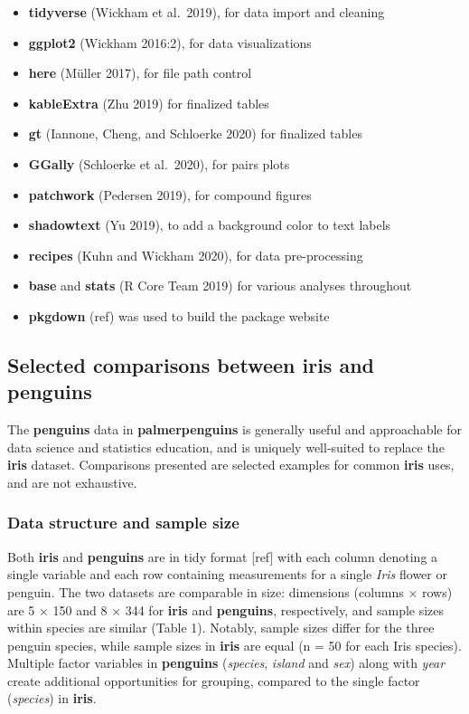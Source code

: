 \begin{itemize}
\tightlist
\item
  \textbf{tidyverse} (Wickham et al.~2019), for data import and cleaning
\item
  \textbf{ggplot2} (Wickham 2016:2), for data visualizations
\item
  \textbf{here} (Müller 2017), for file path control
\item
  \textbf{kableExtra} (Zhu 2019) for finalized tables
\item
  \textbf{gt} (Iannone, Cheng, and Schloerke 2020) for finalized tables
\item
  \textbf{GGally} (Schloerke et al.~2020), for pairs plots
\item
  \textbf{patchwork} (Pedersen 2019), for compound figures
\item
  \textbf{shadowtext} (Yu 2019), to add a background color to text
  labels
\item
  \textbf{recipes} (Kuhn and Wickham 2020), for data pre-processing
\item
  \textbf{base} and \textbf{stats} (R Core Team 2019) for various
  analyses throughout
\item
  \textbf{pkgdown} (ref) was used to build the package website
\end{itemize}

\hypertarget{selected-comparisons-between-iris-and-penguins}{%
\subsection{\texorpdfstring{Selected comparisons between \textbf{iris}
and
\textbf{penguins}}{Selected comparisons between iris and penguins}}\label{selected-comparisons-between-iris-and-penguins}}

The \textbf{penguins} data in \textbf{palmerpenguins} is generally
useful and approachable for data science and statistics education, and
is uniquely well-suited to replace the \textbf{iris} dataset.
Comparisons presented are selected examples for common \textbf{iris}
uses, and are not exhaustive.

\hypertarget{data-structure-and-sample-size}{%
\subsubsection{Data structure and sample
size}\label{data-structure-and-sample-size}}

Both \textbf{iris} and \textbf{penguins} are in tidy format {[}ref{]}
with each column denoting a single variable and each row containing
measurements for a single \emph{Iris} flower or penguin. The two
datasets are comparable in size: dimensions (columns × rows) are 5 × 150
and 8 × 344 for \textbf{iris} and \textbf{penguins}, respectively, and
sample sizes within species are similar (Table 1). Notably, sample sizes
differ for the three penguin species, while sample sizes in
\textbf{iris} are equal (n = 50 for each Iris species). Multiple factor
variables in \textbf{penguins} (\emph{species}, \emph{island} and
\emph{sex}) along with \emph{year} create additional opportunities for
grouping, compared to the single factor (\emph{species}) in
\textbf{iris}.

